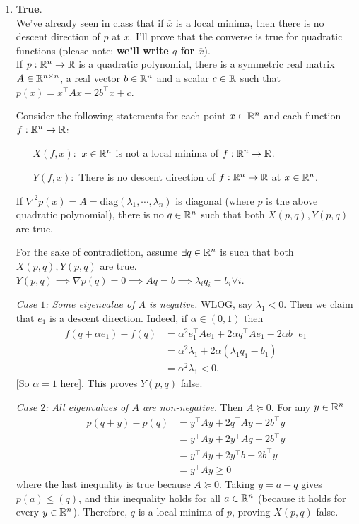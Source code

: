 \soln

\begin{enumerate}[leftmargin=*]
\item \textbf{True}.\\
We've already seen in class that if $\overline x$ is a local minima, then there is no descent direction of $p$ at $\overline x$. I'll prove that the converse is true for quadratic functions (please note: \textbf{we'll write $q$ for $\overline x$}). \\
If $p:\mathbb{R}^n\to \mathbb{R}$ is a quadratic polynomial, there is a symmetric real matrix $A\in \mathbb{R}^{n\times n}$, a real vector $b\in\mathbb{R}^n$ and a scalar $c\in \mathbb{R}$ such that $p(x) = x^\top Ax - 2b^\top x + c$. 

Consider the following statements for each point $x\in \mathbb{R}^n$ and each function $f:\mathbb{R}^n\to \mathbb{R}$:
\begin{itemize}[leftmargin=1in]
\item[$X(f,x):$] $x\in\mathbb{R}^n$ is not a local minima of $f:\mathbb{R}^n\to \mathbb{R}$.
\item[$Y(f,x):$] There is no descent direction of $f:\mathbb{R}^n\to \mathbb{R}$ at $x\in\mathbb{R}^n$.
\end{itemize}

\begin{lemma}\label{diag}
If $\nabla^2 p(x) = A = \text{diag}(\lambda_1,\cdots,\lambda_n)$ is diagonal (where $p$ is the above quadratic polynomial), there is no $q\in\mathbb{R}^n$ such that both $X(p,q),Y(p,q)$ are true.
\end{lemma}
\begin{pf}
For the sake of contradiction, assume $\exists q\in\mathbb{R}^n$ is such that both $X(p,q),Y(p,q)$ are true. $Y(p,q)\implies \nabla p(q) = 0\implies Aq=b\implies \lambda_iq_i=b_i\forall i$.

\textit{Case $1$: Some eigenvalue of $A$ is negative.} WLOG, say $\lambda_1<0$. Then we claim that $e_1$ is a descent direction. Indeed, if $\alpha\in (0,1)$ then \begin{align*}
f(q+\alpha e_1)-f(q) &= \alpha^2 e_1^\top Ae_1 + 2\alpha q^\top Ae_1 - 2\alpha b^\top e_1 \\
&= \alpha^2 \lambda_1 + 2\alpha(\lambda_1 q_1 - b_1) \\
&= \alpha^2 \lambda_1 < 0.\end{align*}
[So $\overline \alpha=1$ here]. This proves $Y(p,q)$ false.

\textit{Case $2$: All eigenvalues of $A$ are non-negative.} Then $A\succeq 0$. For any $y\in\mathbb{R}^n$
\begin{align*}
p(q+y)-p(q) &= y^\top A y + 2q^\top Ay -2b^\top y \\
&= y^\top A y + 2y^\top Aq -2b^\top y \\
&= y^\top A y + 2y^\top b -2b^\top y \\
&= y^\top Ay \geq 0\end{align*} where the last inequality is true because $A\succeq 0.$
Taking $y=a-q$ gives $p(a)\leq (q)$, and this inequality holds for all $a\in\mathbb{R}^n$ (because it holds for every $y\in\mathbb{R}^n$). Therefore, $q$ is a local minima of $p$, proving $X(p,q)$ false.


\end{pf}
\end{enumerate}
